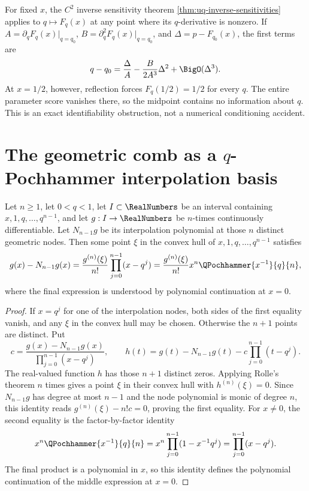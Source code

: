 For fixed \(x\), the \(C^2\) inverse sensitivity theorem
\cref{thm:uq-inverse-sensitivities} applies to \(q\mapsto F_q(x)\) at any point
where its \(q\)-derivative is nonzero.  If
\(A=\partial_qF_q(x)|_{q=q_0}\), \(B=\partial_q^2F_q(x)|_{q=q_0}\), and
\(\Delta=p-F_{q_0}(x)\), the first terms are
\[
 q-q_0=\frac\Delta A-\frac{B}{2A^3}\Delta^2+\BigO(\Delta^3).
\]
At \(x=1/2\), however, reflection forces \(F_q(1/2)=1/2\) for every \(q\).
The entire parameter score vanishes there, so the midpoint contains no
information about \(q\).  This is an exact identifiability obstruction, not a
numerical conditioning accident.

\section{\texorpdfstring{The geometric comb as a \(q\)-Pochhammer interpolation basis}{The geometric comb as a q-Pochhammer interpolation basis}}
\label{sec:fr-geometric-interpolation}

\begin{proposition}
\label{prop:fr-newton-qpochhammer}
Let \(n\ge1\), let \(0<q<1\), let \(I\subset\RealNumbers\) be an interval containing
\(x,1,q,\ldots,q^{n-1}\), and let \(g:I\to\RealNumbers\) be \(n\)-times continuously
differentiable.  Let \(N_{n-1}g\) be its interpolation polynomial at those
\(n\) distinct geometric nodes.  Then some point \(\xi\) in the convex hull of
\(x,1,q,\ldots,q^{n-1}\) satisfies
\begin{equation}
 g(x)-N_{n-1}g(x)
 =\frac{g^{(n)}(\xi)}{n!}
 \prod_{j=0}^{n-1}(x-q^j)
 =\frac{g^{(n)}(\xi)}{n!}x^n\QPochhammer{x^{-1}}{q}{n},
 \label{eq:fr-newton-qpochhammer}
\end{equation}
where the final expression is understood by polynomial continuation at
\(x=0\).
\end{proposition}

\begin{proof}
If \(x=q^j\) for one of the interpolation nodes, both sides of the first
equality vanish, and any \(\xi\) in the convex hull may be chosen.  Otherwise
the \(n+1\) points are distinct.  Put
\[
 c=\frac{g(x)-N_{n-1}g(x)}{\prod_{j=0}^{n-1}(x-q^j)},
 \qquad
 h(t)=g(t)-N_{n-1}g(t)-c\prod_{j=0}^{n-1}(t-q^j).
\]
The real-valued function \(h\) has those \(n+1\) distinct zeros.  Applying
Rolle's theorem \(n\) times gives a point \(\xi\) in their convex hull with
\(h^{(n)}(\xi)=0\).  Since \(N_{n-1}g\) has degree at most \(n-1\) and the
node polynomial is monic of degree \(n\), this identity reads
\(g^{(n)}(\xi)-n!c=0\), proving the first equality.  For \(x\ne0\), the second
equality is the factor-by-factor identity
\[
 x^n\QPochhammer{x^{-1}}{q}{n}
 =x^n\prod_{j=0}^{n-1}(1-x^{-1}q^j)
 =\prod_{j=0}^{n-1}(x-q^j).
\]
The final product is a polynomial in \(x\), so this identity defines the
polynomial continuation of the middle expression at \(x=0\).
\end{proof}

